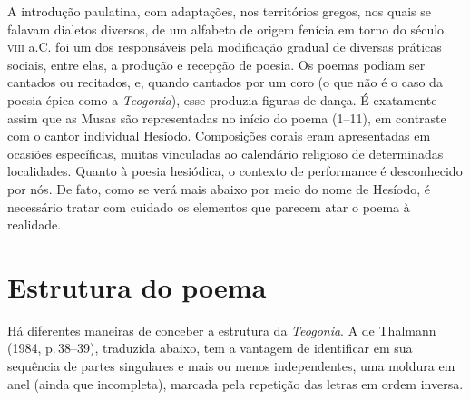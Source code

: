 A introdução paulatina, com adaptações, nos territórios gregos, nos
quais se falavam dialetos diversos, de um alfabeto de origem fenícia em
torno do século \textsc{viii} a.C. foi um dos responsáveis pela modificação
gradual de diversas práticas sociais, entre elas, a produção e recepção
de poesia. Os poemas podiam ser cantados ou recitados, e, quando
cantados por um coro (o que não é o caso da poesia épica como a
\textit{Teogonia}), esse produzia figuras de dança. É exatamente assim que
as Musas são representadas no início do poema (1--11), em contraste com o
cantor individual Hesíodo. Composições corais eram apresentadas em
ocasiões específicas, muitas vinculadas ao calendário religioso de
determinadas localidades. Quanto à poesia hesiódica, o contexto de
performance é desconhecido por nós. De fato, como se verá mais abaixo
por meio do nome de Hesíodo, é necessário tratar com cuidado os
elementos que parecem atar o poema à realidade.

\section{Estrutura do poema}

Há diferentes maneiras de conceber a estrutura da \textit{Teogonia}. A de
Thalmann (1984, p.\,38--39), traduzida abaixo, tem a vantagem de
identificar em sua sequência de partes singulares e mais ou menos
independentes, uma moldura em anel (ainda que incompleta), marcada pela
repetição das letras em ordem inversa.

